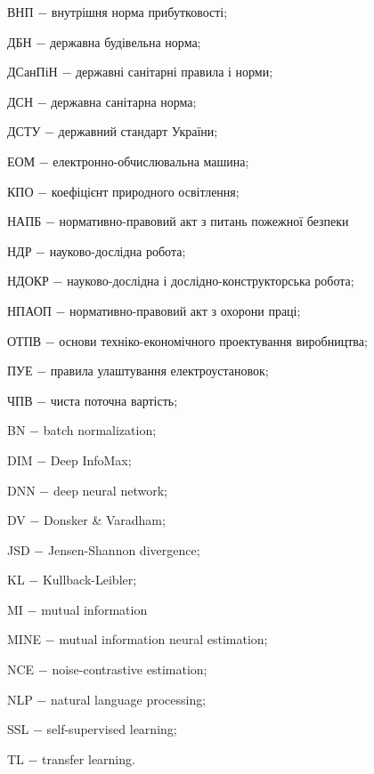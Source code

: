 

\hspace*{26pt}

ВНП $-$ внутрішня норма прибутковості;

ДБН $-$ державна будівельна норма;

ДСанПіН $-$ державні санітарні правила і норми;

ДСН $-$ державна санітарна норма;

ДСТУ $-$ державний стандарт України;

ЕОМ $-$ електронно-обчислювальна машина;

КПО $-$ коефіцієнт природного освітлення;

НАПБ $-$ нормативно-правовий акт з питань пожежної безпеки

НДР $-$ науково-дослідна робота;

НДОКР $-$ науково-дослідна і дослідно-конструкторська робота;

НПАОП $-$ нормативно-правовий акт з охорони праці;

ОТПВ $-$ основи техніко-економічного проектування виробництва;

ПУЕ $-$ правила улаштування електроустановок;

ЧПВ $-$ чиста поточна вартість;


BN $-$ batch normalization;

DIM $-$ Deep InfoMax;

DNN $-$ deep neural network;

DV $-$ Donsker \& Varadham;

JSD $-$ Jensen-Shannon divergence;

KL $-$ Kullback-Leibler;

MI $-$ mutual information

MINE $-$ mutual information neural estimation;

NCE $-$ noise-contrastive estimation;

NLP $-$ natural language processing;

SSL $-$ self-supervised learning;

TL $-$ transfer learning.
